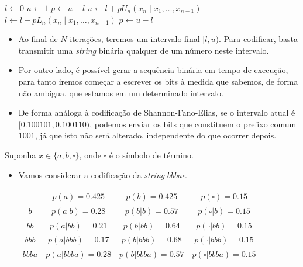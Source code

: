 \begin{frame}[allowframebreaks]
  \begin{algorithmic}
  \State $l\gets 0$
  \State $u\gets 1$
  \State $p\gets u-l$ 
	\State $u\gets l + p U_n(x_n \mid x_1, \ldots, x_{n-1})$
	\State $l\gets l + p L_n(x_n \mid x_1, \ldots, x_{n-1})$
	\State $p\gets u - l$
  \EndFor 
  \end{algorithmic}

  \begin{itemize}
  \item Ao final de $N$ iterações, teremos um intervalo final $[l,u)$. 
 	Para codificar, basta transmitir uma \textit{string} binária qualquer de um número neste intervalo.
  \item Por outro lado, é possível gerar a sequência binária em tempo de execução, para tanto iremos
	começar a escrever os bits à medida que sabemos, de forma não ambígua, que estamos em um determinado intervalo.
  \item De forma análoga à codificação de Shannon-Fano-Elias, se o intervalo atual é $[0.100101, 0.100110)$, podemos
	enviar os bits que constituem o prefixo comum $1001$, já que isto não será alterado, independente do que ocorrer depois.
  \end{itemize}

  \framebreak

  \begin{example}
  Suponha $x \in \{a,b,\square\}$, onde $\square$ é o símbolo de término.
  
  \begin{itemize}
  \item Vamos considerar a codificação da \textit{string} $bbba\square$.
  \begin{tabular}{cccc}
  -  & $p(a) = 0.425$ & $p(b) = 0.425$ & $p(\square) = 0.15$ \\
  $b$  & $p(a|b) = 0.28$ & $p(b|b) = 0.57$ & $p(\square | b) = 0.15$ \\
  $bb$ & $p(a|bb) = 0.21$ & $p(b|bb) = 0.64$ & $p(\square | bb) = 0.15$ \\
  $bbb$ & $p(a|bbb) = 0.17$ & $p(b|bbb) = 0.68$ & $p(\square | bbb) = 0.15$ \\
  $bbba$ & $p(a|bbba) = 0.28$ & $p(b|bbba) = 0.57$ & $p(\square | bbba) = 0.15$ 
  \end{tabular}
  \end{itemize}

  \examplebreak


\end{example}
\end{frame}
